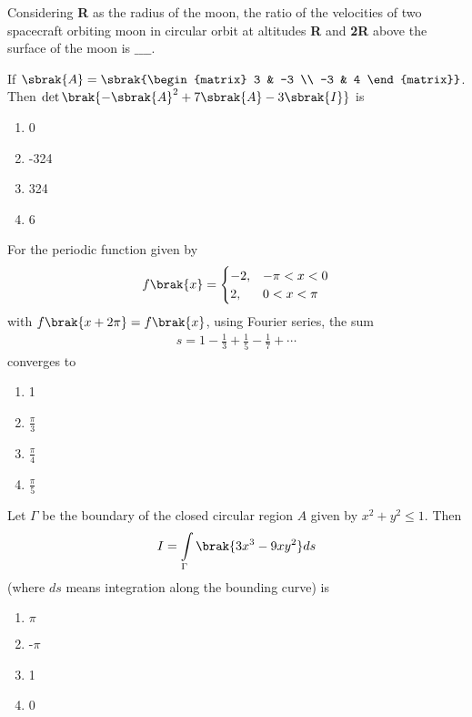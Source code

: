 \item Considering \textbf{R} as the radius of the moon, the ratio of the velocities of two spacecraft orbiting moon in circular orbit at altitudes \textbf{R} and \textbf{2R} above the surface of the moon is $\_\_\_\_$. \\
\item If $\sbrak{A} = \sbrak{\begin{matrix}
    3 & -3 \\ -3 & 4
\end{matrix}}$. Then $\det\brak{-\sbrak{A}^2 + 7\sbrak{A} - 3\sbrak{I}}$ is
\begin{enumerate}
    \item 0
    \item -324
    \item 324 
    \item 6 \\
\end{enumerate}
\item For the periodic function given by
\begin{align*}
    f\brak{x} = \begin{cases}
        -2, & -\pi < x < 0 \\
        2, & 0 < x < \pi
    \end{cases}
\end{align*}
with $f\brak{x+2\pi} = f\brak{x}$, using Fourier series, the sum
\begin{align*}
    s = 1 - \frac{1}{3} + \frac{1}{5} - \frac{1}{7} + \cdots
\end{align*}
converges to
\begin{enumerate}
    \item 1
    \item $\frac{\pi}{3}$
    \item $\frac{\pi}{4}$
    \item $\frac{\pi}{5}$ \\
\end{enumerate}
\item Let $\Gamma$ be the boundary of the closed circular region $A$ given by $x^2 + y^2 \leq 1$. Then 
\begin{align*}
    I = \int\limits_{\Gamma}\brak{3x^3 - 9xy^2}ds
\end{align*}
(where $ds$ means integration along the bounding curve) is 
  \begin{enumerate}
   \item $\pi$
   \item -$\pi$
   \item 1
   \item 0 \\
\end{enumerate}
